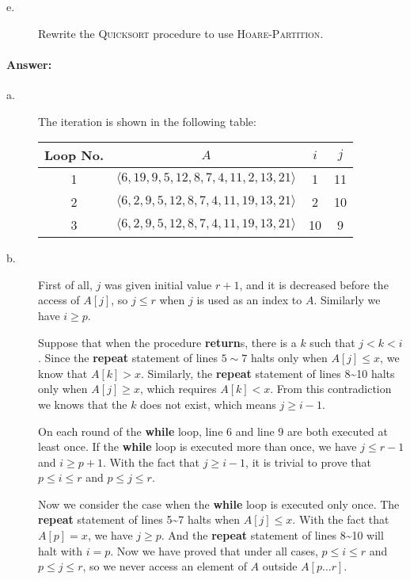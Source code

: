 \documentclass[a4paper,10pt]{article}
\newcommand{\answer}{\paragraph{Answer:}}
\begin{document}
\begin{description}
\item[e. \hspace{9pt}] Rewrite the \textsc{Quicksort} procedure to use \textsc{Hoare-Partition}.
\end{description}

\answer

\begin{description}
\item[a. \hspace{9pt}] The iteration is shown in the following table:

\begin{center}
\begin{tabular}{|c|c|c|c|}
\hline
Loop No. & $A$ & $i$ & $j$\\\hline
1 & $\langle 6, 19, 9, 5, 12, 8, 7, 4, 11, 2, 13, 21\rangle$ & 1 & 11\\\hline
2 & $\langle 6, 2, 9, 5, 12, 8, 7, 4, 11, 19, 13, 21\rangle$ & 2 & 10\\\hline
3 & $\langle 6, 2, 9, 5, 12, 8, 7, 4, 11, 19, 13, 21\rangle$ & 10 & 9\\\hline
\end{tabular}
\end{center}

\item[b. \hspace{9pt}] First of all, $j$ was given initial value $r + 1$, and it is decreased before
the access of $A[j]$, so $j\leq r$ when $j$ is used as an index to $A$.
Similarly we have $i \geq p$.

Suppose that when the procedure \textbf{return}s, there is a $k$ such that $j < k < i$.
Since the \textbf{repeat} statement of lines $5 \sim 7$ halts only when $A[j] \leq x$, 
we know that $A[k] > x$. Similarly, the \textbf{repeat} statement of lines 8\textasciitilde 10
halts only when $A[j] \geq x$, which requires $A[k] < x$. From this contradiction we knows
that the $k$ does not exist, which means $j \geq i - 1$.

On each round of the \textbf{while} loop, line 6 and line 9 are both executed at least once.
If the \textbf{while} loop is executed more than once, we have $j \leq r - 1$ and
$i \geq p + 1$. With the fact that $j \geq i -1$, it is trivial to prove that 
$p \leq i \leq r$ and $p \leq j \leq r$.


Now we consider the case when the \textbf{while} loop is executed only once. The
\textbf{repeat} statement of lines 5\textasciitilde 7 halts when $A[j] \leq x$. With the fact that $A[p] = x$,
we have $j \geq p$. And the \textbf{repeat} statement of lines 8\textasciitilde 10 will halt with $i = p$.
Now we have proved that under all cases, $p \leq i \leq r$ and $p \leq j \leq r$, 
so we never access an element of $A$ outside $A[p\ldots r]$.


\end{description}
\end{document}
